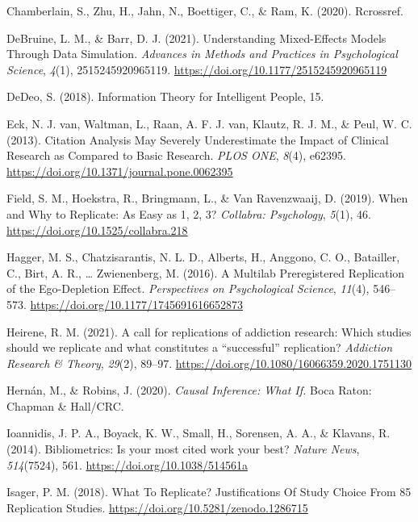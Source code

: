 \documentclass[
  english,
  jou,floatsintext]{apa6}
\newlength{\cslhangindent}
\newenvironment{cslreferences}%
  {\setlength{\parindent}{0pt}%
  \everypar{\setlength{\hangindent}{\cslhangindent}}\ignorespaces}%
  {\par}
\begin{document}
\begin{cslreferences}
\leavevmode\hypertarget{ref-Chamberlain2020}{}%
Chamberlain, S., Zhu, H., Jahn, N., Boettiger, C., \& Ram, K. (2020). Rcrossref.

\leavevmode\hypertarget{ref-DeBruine2021}{}%
DeBruine, L. M., \& Barr, D. J. (2021). Understanding Mixed-Effects Models Through Data Simulation. \emph{Advances in Methods and Practices in Psychological Science}, \emph{4}(1), 2515245920965119. \url{https://doi.org/10.1177/2515245920965119}

\leavevmode\hypertarget{ref-DeDeo2018}{}%
DeDeo, S. (2018). Information Theory for Intelligent People, 15.

\leavevmode\hypertarget{ref-Eck2013}{}%
Eck, N. J. van, Waltman, L., Raan, A. F. J. van, Klautz, R. J. M., \& Peul, W. C. (2013). Citation Analysis May Severely Underestimate the Impact of Clinical Research as Compared to Basic Research. \emph{PLOS ONE}, \emph{8}(4), e62395. \url{https://doi.org/10.1371/journal.pone.0062395}

\leavevmode\hypertarget{ref-Field2019}{}%
Field, S. M., Hoekstra, R., Bringmann, L., \& Van Ravenzwaaij, D. (2019). When and Why to Replicate: As Easy as 1, 2, 3? \emph{Collabra: Psychology}, \emph{5}(1), 46. \url{https://doi.org/10.1525/collabra.218}

\leavevmode\hypertarget{ref-Hagger2016}{}%
Hagger, M. S., Chatzisarantis, N. L. D., Alberts, H., Anggono, C. O., Batailler, C., Birt, A. R., \ldots{} Zwienenberg, M. (2016). A Multilab Preregistered Replication of the Ego-Depletion Effect. \emph{Perspectives on Psychological Science}, \emph{11}(4), 546--573. \url{https://doi.org/10.1177/1745691616652873}

\leavevmode\hypertarget{ref-Heirene2021}{}%
Heirene, R. M. (2021). A call for replications of addiction research: Which studies should we replicate and what constitutes a ``successful'' replication? \emph{Addiction Research \& Theory}, \emph{29}(2), 89--97. \url{https://doi.org/10.1080/16066359.2020.1751130}

\leavevmode\hypertarget{ref-Hernan2020}{}%
Hernán, M., \& Robins, J. (2020). \emph{Causal Inference: What If.} Boca Raton: Chapman \& Hall/CRC.

\leavevmode\hypertarget{ref-Ioannidis2014}{}%
Ioannidis, J. P. A., Boyack, K. W., Small, H., Sorensen, A. A., \& Klavans, R. (2014). Bibliometrics: Is your most cited work your best? \emph{Nature News}, \emph{514}(7524), 561. \url{https://doi.org/10.1038/514561a}

\leavevmode\hypertarget{ref-Isager2018}{}%
Isager, P. M. (2018). What To Replicate? Justifications Of Study Choice From 85 Replication Studies. \url{https://doi.org/10.5281/zenodo.1286715}


\end{cslreferences}
\end{document}
